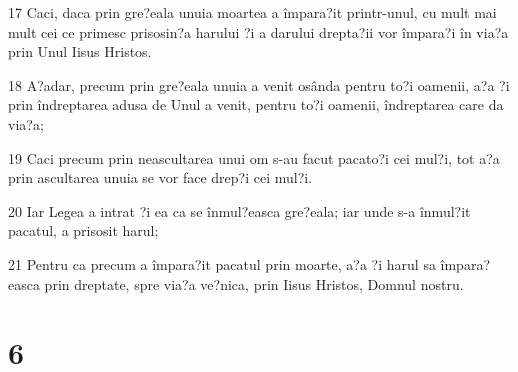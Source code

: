 \par 17 Caci, daca prin gre?eala unuia moartea a împara?it printr-unul, cu mult mai mult cei ce primesc prisosin?a harului ?i a darului drepta?ii vor împara?i în via?a prin Unul Iisus Hristos.
\par 18 A?adar, precum prin gre?eala unuia a venit osânda pentru to?i oamenii, a?a ?i prin îndreptarea adusa de Unul a venit, pentru to?i oamenii, îndreptarea care da via?a;
\par 19 Caci precum prin neascultarea unui om s-au facut pacato?i cei mul?i, tot a?a prin ascultarea unuia se vor face drep?i cei mul?i.
\par 20 Iar Legea a intrat ?i ea ca se înmul?easca gre?eala; iar unde s-a înmul?it pacatul, a prisosit harul;
\par 21 Pentru ca precum a împara?it pacatul prin moarte, a?a ?i harul sa împara?easca prin dreptate, spre via?a ve?nica, prin Iisus Hristos, Domnul nostru.

\chapter{6}

